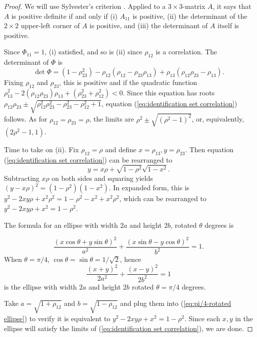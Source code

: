 \begin{proof}
We will use Sylvester's criterion \parencite{Gilbert1991-ch}. Applied
to a $3\times3$-matrix $A$, it says that $A$ is positive definite
if and only if (i) $A_{11}$ is positive, (ii) the determinant of
the $2\times2$ upper-left corner of $A$ is positive, and (iii) the
determinant of $A$ itself is positive. 

Since $\Phi_{11}=1$, (i) satisfied, and so is (ii) since $\rho_{12}$
is a correlation. The determinant of $\Phi$ is
\begin{equation*}
\det\Phi = (1-\rho_{23}^{2})-\rho_{12}(\rho_{12}-\rho_{23}\rho_{13})+\rho_{13}(\rho_{12}\rho_{23}-\rho_{13}).
\end{equation*}
Fixing $\rho_{12}$ and $\rho_{23}$, this is positive and if the
quadratic function $\rho_{13}^{2}-2(\rho_{12}\rho_{23})\rho_{13}+(\rho_{23}^{2}+\rho_{12}^{2})<0$.
Since this equation has roots $\rho_{12}\rho_{23}\pm\sqrt{\rho_{12}^{2}\rho_{23}^{2}-\rho_{23}^{2}-\rho_{12}^{2}+1}$,
equation (\ref{eq:identification set correlation}) follows. As for
$\rho_{12}=\rho_{23}=\rho$, the limits are $\rho^{2}\pm\sqrt{(\rho^{2}-1)^{2}}$,
or, equivalently, $(2\rho^{2}-1,1).$

Time to take on (ii). Fix $\rho_{12}=\rho$ and define $x=\rho_{13},y=\rho_{23}$.
Then equation (\ref{eq:identification set correlation}) can be rearranged
to
\begin{equation}
y=x\rho+\sqrt{1-\rho^{2}}\sqrt{1-x^{2}}.\label{eq:ellipse eq1}
\end{equation}
Subtracting $x\rho$ on both sides and squaring yields $(y-x\rho)^{2}=(1-\rho^{2})(1-x^{2}).$
In expanded form, this is $y^{2}-2xy\rho+x^{2}\rho^{2}=1-\rho^{2}-x^{2}+x^{2}\rho^{2}$,
which can be rearranged to $y^{2}-2xy\rho+x^{2}=1-\rho^{2}$. 

The formula for an ellipse with width $2a$ and height $2b$, rotated
$\theta$ degrees is

\[
\frac{(x\cos\theta+y\sin\theta)^{2}}{a^{2}}+\frac{(x\sin\theta-y\cos\theta)^{2}}{b^{2}}=1.
\]
When $\theta=\pi/4$, $\cos\theta=\sin\theta=1/\sqrt{2}$, hence 
\begin{equation}
\frac{(x+y)^{2}}{2a^{2}}+\frac{(x-y)^{2}}{2b^{2}}=1\label{eq:pi/4-rotated ellipse}
\end{equation}
is the ellipse with width $2a$ and height $2b$ rotated $\theta=\pi/4$
degrees.

Take $a=\sqrt{1+\rho_{12}}$ and $b=\sqrt{1-\rho_{12}}$ and plug
them into (\ref{eq:pi/4-rotated ellipse}) to verify it is equivalent
to $y^{2}-2xy\rho+x^{2}=1-\rho^{2}$. Since each $x,y$ in the ellipse
will satisfy the limits of (\ref{eq:identification set correlation}),
we are done.
\end{proof}
